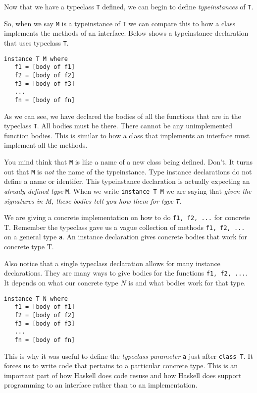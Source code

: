 Now that we have a typeclass \lstinline{T} defined, we can begin to define 
\textit{typeinstances} of \lstinline{T}. 


So, when we say \lstinline{M} is a typeinstance of \lstinline{T} 
we can compare this to how a class implements the methods of an interface. 
Below shows a typeinstance declaration that uses typeclass \lstinline{T}.

\begin{lstlisting}
instance T M where
   f1 = [body of f1]
   f2 = [body of f2]
   f3 = [body of f3]
   ...
   fn = [body of fn]
\end{lstlisting}

As we can see, we have declared the bodies of all the functions that are in 
the typeclass \lstinline{T}. All bodies must be there. 
There cannot be any unimplemented function bodies. This is similar to 
how a class that implements an interface must implement all the methods.

You mind think that \lstinline{M} is like a name of a new class being defined. 
Don't. It turns out that \lstinline{M} is \textit{not} the name of the typeinstance. 
Type instance declarations do not define a  name or identifer.
This typeinstance declaration is actually expecting 
an \textit{already defined type} \lstinline{M}.
When we write \lstinline{instance T M} we are saying
that \textit{given the signatures in M, these bodies tell you how them for type \lstinline{T}}. 

We are giving a concrete implementation on how to do  \lstinline{f1, f2, ...} 
for concrete T. Remember the typeclass gave us a vague collection 
of methods \lstinline{f1, f2, ...} on a general type \lstinline{a}. 
An instance declaration gives concrete bodies that work for concrete type T.

Also notice that a single typeclass declaration allows for many instance declarations. 
They are many ways to give bodies for the functions \lstinline{f1, f2, ...}. 
It depends on what our concrete type $N$ is and what bodies work for that type. 

\begin{lstlisting}
instance T N where
   f1 = [body of f1]
   f2 = [body of f2]
   f3 = [body of f3]
   ...
   fn = [body of fn]
\end{lstlisting}

This is why it was useful to define the \textit{typeclass parameter}
\lstinline{a} just after \lstinline{class T}. It forces us to write 
 code that pertains to a particular concrete type. 
This is an important part of how Haskell does code resuse and how Haskell 
does support programming to an interface rather than to an implementation. 




